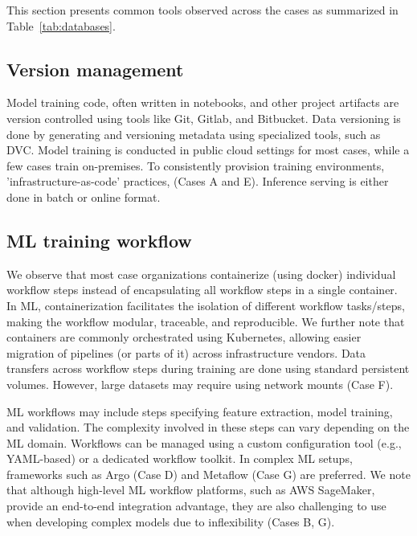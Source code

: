 This section presents common tools observed across the cases as summarized in Table~\ref{tab:databases}.



\subsection{Version management}
Model training code, often written in notebooks, and other project artifacts are version controlled using tools like Git, Gitlab, and Bitbucket. Data versioning is done by generating and versioning metadata using specialized tools, such as DVC. 
Model training is conducted in public cloud settings for most cases, while a few cases train on-premises. To consistently provision training environments, 'infrastructure-as-code' practices, \DIFdelbegin {}\DIFdelend \DIFaddbegin {}\DIFaddend (Cases A and E). Inference serving is either done in batch or online format.


\subsection{ML training workflow}
We observe that most case organizations containerize (using docker) individual workflow steps instead of encapsulating all workflow steps in a single container. In ML, containerization facilitates the isolation of different workflow tasks/steps, making the workflow modular, traceable, and reproducible. We further note that containers are commonly orchestrated using Kubernetes, allowing easier migration of pipelines (or parts of it) across infrastructure vendors. Data transfers across workflow steps during training are done using standard persistent volumes. However, large datasets may require using network mounts (Case F).

ML workflows may include steps specifying feature extraction, model training, and validation. The complexity involved in these steps can vary depending on the ML domain. Workflows can be managed using a custom configuration tool (e.g., YAML-based) or a dedicated workflow toolkit. In complex ML setups, frameworks such as Argo (Case D) and Metaflow (Case G) are preferred. We note that although high-level ML workflow platforms, such as AWS SageMaker, provide an end-to-end integration advantage, they are also challenging to use when developing complex models due to inflexibility (Cases B, G).

